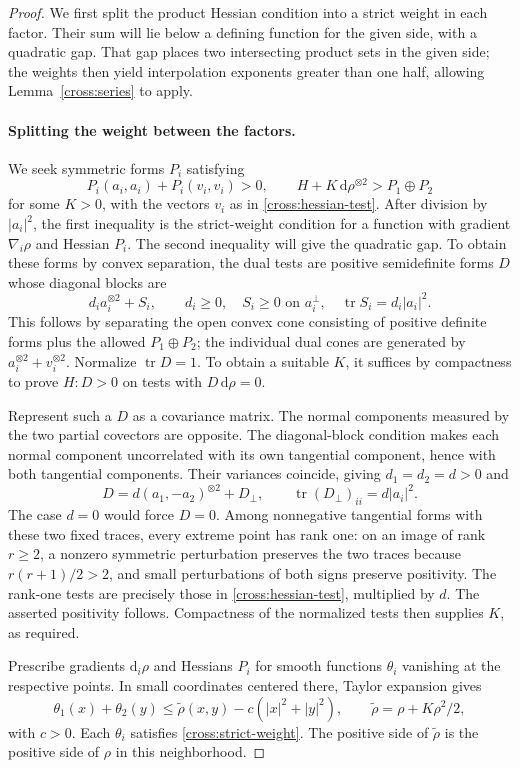\documentclass[11pt]{article}
\theoremstyle{definition}
\theoremstyle{remark}
\newcommand{\dd}{\mathrm d}
\DeclareMathOperator{\tr}{tr}
\numberwithin{equation}{section}
\begin{document}
\begin{proof}
We first split the product Hessian condition into a strict weight in
each factor. Their sum will lie below a defining function for the given
side, with a quadratic gap. That gap places two intersecting product
sets in the given side; the weights then yield interpolation exponents
greater than one half, allowing Lemma~\ref{cross:series} to apply.

\paragraph{Splitting the weight between the factors.}
We seek symmetric forms $P_i$ satisfying
\[
 P_i(a_i,a_i)+P_i(v_i,v_i)>0,
 \qquad H+K\,\dd\rho^{\otimes2}>P_1\oplus P_2
\]
for some $K>0$, with the vectors $v_i$ as in
\eqref{cross:hessian-test}. After division by $|a_i|^2$, the first
inequality is the strict-weight condition for a function with gradient
$\nabla_i\rho$ and Hessian $P_i$. The second inequality will give the
quadratic gap. To obtain these forms by convex separation, the dual
tests are positive semidefinite forms $D$ whose diagonal blocks are
\[
 d_i a_i^{\otimes2}+S_i,\qquad
 d_i\ge0,\quad S_i\ge0\text{ on }a_i^\perp,
 \quad \tr S_i=d_i|a_i|^2.
\]
This follows by separating the open convex cone consisting of positive
definite forms plus the allowed $P_1\oplus P_2$; the individual dual
cones are generated by $a_i^{\otimes2}+v_i^{\otimes2}$.
Normalize $\tr D=1$.  To obtain a suitable $K$, it suffices by
compactness to prove $H:D>0$ on tests with $D\,\dd\rho=0$.

Represent such a $D$ as a covariance matrix.  The normal components
measured by the two partial covectors are opposite.  The diagonal-block
condition makes each normal component uncorrelated with its own
tangential component, hence with both tangential components.
Their variances coincide, giving $d_1=d_2=d>0$ and
\[
 D=d(a_1,-a_2)^{\otimes2}+D_\perp,
 \qquad \tr(D_\perp)_{ii}=d|a_i|^2.
\]
The case $d=0$ would force $D=0$.  Among nonnegative tangential forms
with these two fixed traces, every extreme point has rank one:
on an image of rank $r\ge2$, a nonzero symmetric perturbation preserves
the two traces because $r(r+1)/2>2$, and small perturbations of both
signs preserve positivity.  The rank-one tests are precisely those
in \eqref{cross:hessian-test}, multiplied by $d$.
The asserted positivity follows.  Compactness of the normalized tests
then supplies $K$, as required.

Prescribe gradients $\dd_i\rho$ and Hessians $P_i$ for smooth functions
$\theta_i$ vanishing at the respective points.  In small coordinates
centered there, Taylor expansion gives
\begin{equation}\label{cross:quadratic-gap}
 \theta_1(x)+\theta_2(y)
 \le \widetilde\rho(x,y)-c(|x|^2+|y|^2),
 \qquad \widetilde\rho=\rho+K\rho^2/2,
\end{equation}
with $c>0$.  Each $\theta_i$ satisfies
\eqref{cross:strict-weight}.  The positive side of $\widetilde\rho$
is the positive side of $\rho$ in this neighborhood.


\end{proof}
\end{document}
